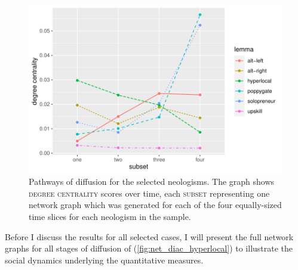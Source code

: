 \documentclass[
  a4paper,
  abstract=on,
  captions=tableabove
  ]{scrartcl}
\begin{document}
      \begin{figure}
        \caption[Centralization over time for the selected neologisms]{Pathways of diffusion for the selected neologisms. The graph shows \textsc{degree centrality} scores over time, each \textsc{subset} representing one network graph which was generated for each of the four equally-sized time slices for each neologism in the sample.}
        \label{fig:cent_diac_cases}
        \centering
        \includegraphics[width=\linewidth, height=.8\textheight, keepaspectratio]{img/cases_cent_diac.pdf}
      \end{figure}

      Before I discuss the results for all selected cases, I will present the full network graphs for all stages of diffusion of  (\ref{fig:net_diac_hyperlocal}) to illustrate the social dynamics underlying the quantitative measures.
\end{document}
